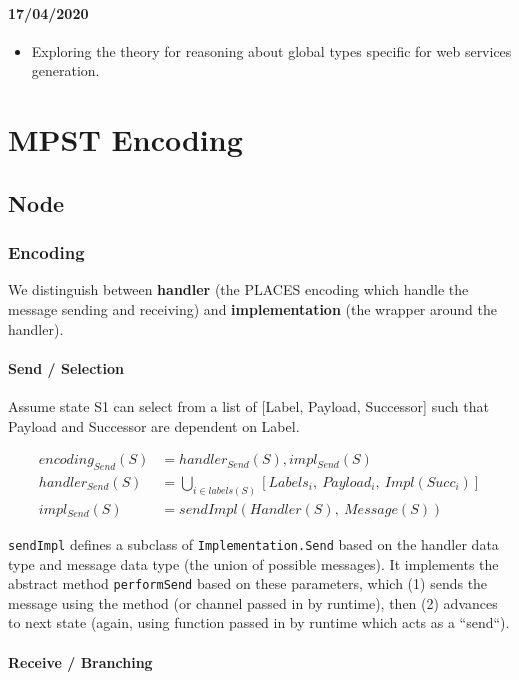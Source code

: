 \documentclass{article}
\begin{document}
\paragraph{17/04/2020}
\begin{itemize}
\item
Exploring the theory for reasoning about global types
specific for web services generation.
\end{itemize}

\section{MPST Encoding}

\subsection{Node}

\subsubsection{Encoding}
We distinguish between \textbf{handler} (the PLACES encoding which handle the
message sending and receiving) and \textbf{implementation} (the wrapper around the handler).

\paragraph{Send / Selection}
Assume state S1 can select from a list of [Label, Payload, Successor] such that Payload and Successor
are dependent on Label.

\begin{align}
encoding_{Send}(S) &= handler_{Send}(S), impl_{Send}(S) \\
handler_{Send}(S) &= \bigcup_{i \in labels(S)} [Labels_i,~Payload_i,~Impl(Succ_i)] \\
impl_{Send}(S) &= sendImpl(Handler(S),~Message(S))
\end{align}

\texttt{sendImpl} defines a subclass of \texttt{Implementation.Send} based on the handler data type
and message data type (the union of possible messages). It implements the abstract method
\texttt{performSend} based on these parameters, which (1) sends the message using
the method (or channel passed in by runtime), then (2) advances to next state (again, using
function passed in by runtime which acts as a ``send``).

\paragraph{Receive / Branching}
\end{document}
